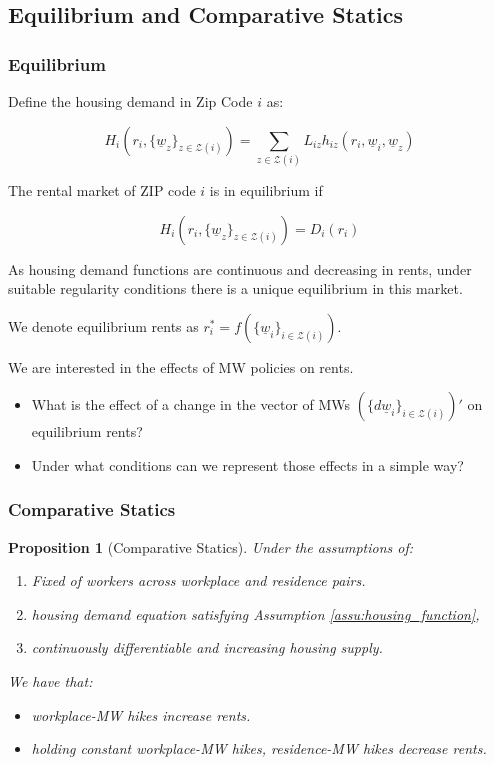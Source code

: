 \documentclass[aspectratio=169, t]{beamer}
\newtheorem{prop}{Proposition}
\newcommand{\Z}{\mathcal{Z}}
\newcommand{\MW}{\underline{w}}
\begin{document}
\subsection{Equilibrium and Comparative Statics}
\begin{frame}
	\frametitle{Equilibrium}
	
	Define the housing demand in Zip Code $i$ as:
	
	 \[
	 H_{i} (r_i, \{\MW_z\}_{z\in\Z(i)}) = \sum_{z\in\Z(i)} L_{iz} h_{iz} (r_i, \MW_i, \MW_z)
	 \]
	
	The rental market of ZIP code $i$ is in equilibrium if
	
	$$ H_{i} (r_i, \{\MW_z\}_{z\in\Z(i)}) = D_i(r_i) $$
	
    As housing demand functions are continuous and decreasing in rents, 
    under suitable regularity conditions there is a unique equilibrium in this market.%
    
    \vspace{2mm}

    We denote equilibrium rents as $r^*_i = f(\{\MW_i\}_{i\in\Z(i)})$.
	
	\vspace{5mm}
	\pause
	We are interested in the effects of MW policies on rents.
	\vspace{1mm}
	\begin{itemize} \small
		\item What is the effect of a change in the vector of MWs 
		$(\{d \MW_i\}_{i\in\Z(i)})'$ on equilibrium rents?
		\item Under what conditions can we represent those effects in a simple way?
	\end{itemize}
\end{frame}

\begin{frame}[label = prop_comp_stat]
    \frametitle{Comparative Statics}
    
    \begin{prop}[Comparative Statics]\label{prop:comparative_statics}
        Under the assumptions of:
        \begin{enumerate}
           \item Fixed of workers across workplace and residence pairs.
            \item housing demand equation satisfying Assumption \ref{assu:housing_function}, 
            \item continuously differentiable and increasing housing supply.
        \end{enumerate} 
        We have that:
        \begin{itemize}
            \item workplace-MW hikes increase rents.
            \item holding constant workplace-MW hikes, residence-MW hikes decrease rents.
        \end{itemize}
    \end{prop}
\end{frame}
\end{document}
